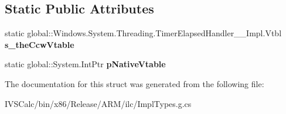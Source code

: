 \subsection*{Static Public Attributes}
\begin{DoxyCompactItemize}
\item 
\mbox{\label{struct_windows_1_1_system_1_1_threading_1_1_timer_elapsed_handler_____impl_1_1_vtbl_a7f38a4f317b4347c1fef7cf24e16b227}} 
static global\+::\+Windows.\+System.\+Threading.\+Timer\+Elapsed\+Handler\+\_\+\+\_\+\+Impl.\+Vtbl {\bfseries s\+\_\+the\+Ccw\+Vtable}
\item 
\mbox{\label{struct_windows_1_1_system_1_1_threading_1_1_timer_elapsed_handler_____impl_1_1_vtbl_af23fc0caf78d17b74928e6580bd9d598}} 
static global\+::\+System.\+Int\+Ptr {\bfseries p\+Native\+Vtable}
\end{DoxyCompactItemize}


The documentation for this struct was generated from the following file\+:\begin{DoxyCompactItemize}
\item 
I\+V\+S\+Calc/bin/x86/\+Release/\+A\+R\+M/ilc/Impl\+Types.\+g.\+cs\end{DoxyCompactItemize}
